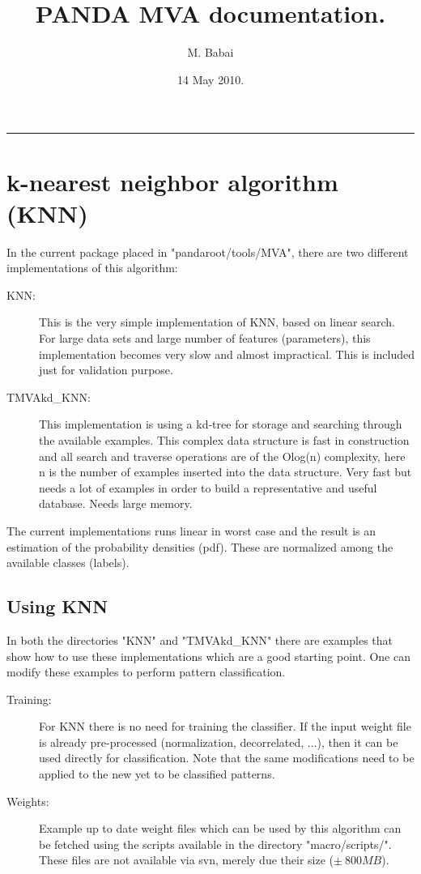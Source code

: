 \documentclass[twoside, a4paper, final]{article}
\title{PANDA MVA documentation.}
\author{M. Babai}
\date{14 May 2010.}
\begin{document}
\maketitle
\begin{center}
\rule[0.1mm]{5.0cm}{2.0mm}
\end{center}
\tableofcontents
\hrulefill
\newpage
\section{k-nearest neighbor algorithm (KNN)}
In the current package placed in "pandaroot/tools/MVA", there are
two different implementations of this algorithm:
\begin{description}
\item [KNN:] This is the very simple implementation of KNN, based on
  linear search. For large data sets and large number of features
  (parameters), this implementation becomes very slow and almost
  impractical. This is included just for validation purpose.
\item [TMVAkd\_KNN:] This implementation is using a kd-tree for
  storage and searching through the available examples. This complex
  data structure is fast in construction and all search and traverse
  operations are of the Olog(n) complexity, here n is the number of
  examples inserted into the data structure. Very fast but needs a lot
  of examples in order to build a representative and useful
  database. Needs large memory.
\end{description}

The current implementations runs linear in worst case and the result
is an estimation of the probability densities (pdf). These are
normalized among the available classes (labels).

\subsection{Using KNN}
In both the directories "KNN" and "TMVAkd\_KNN" there are examples
that show how to use these implementations which are a good starting
point. One can modify these examples to perform pattern
classification.
\begin{description}
\item [Training:] For KNN there is no need for training the
  classifier. If the input weight file is already pre-processed
  (normalization, decorrelated, ...), then it can be used directly for
  classification. Note that the same modifications need to be applied
  to the new yet to be classified patterns.
\item [Weights:] Example up to date weight files which can be used by
  this algorithm can be fetched using the scripts available in the
  directory "macro/scripts/". These files are not available via svn,
  merely due their size ($\pm \ 800MB$).
\end{description}
\end{document}
